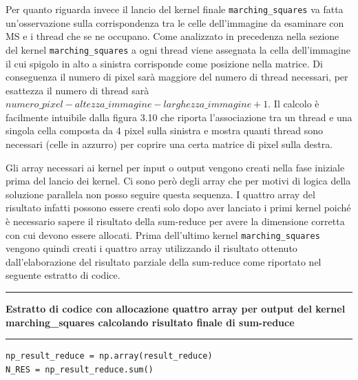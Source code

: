 \documentclass[12pt,a4paper]{report}
\begin{document}
{\newpage
Per quanto riguarda invece il lancio del kernel finale \verb|marching_squares| va fatta un'osservazione sulla corrispondenza tra le celle dell'immagine da esaminare con MS e i thread che se ne occupano. Come analizzato in precedenza nella sezione del kernel \verb|marching_squares| a ogni thread viene assegnata la cella dell'immagine il cui spigolo in alto a sinistra corrisponde come posizione nella matrice. Di conseguenza il numero di pixel sarà maggiore del numero di thread necessari, per esattezza il numero di thread sarà $numero\_pixel - altezza\_immagine - larghezza\_immagine + 1$. Il calcolo è facilmente intuibile dalla figura 3.10 che riporta l'associazione tra un thread e una singola cella composta da 4 pixel sulla sinistra e mostra quanti thread sono necessari (celle in azzurro) per coprire una certa matrice di pixel sulla destra.

\begin{figure}[H]
\centering
\begin{floatrow}[1]
\end{floatrow}
\end{figure} 
\newpage
Gli array necessari ai kernel per input o output vengono creati nella fase iniziale prima del lancio dei kernel. Ci sono però degli array che per motivi di logica della soluzione parallela non posso seguire questa sequenza. I quattro array del risultato infatti possono essere creati solo dopo aver lanciato i primi kernel poiché è necessario sapere il risultato della sum-reduce per avere la dimensione corretta con cui devono essere allocati.
Prima dell'ultimo kernel \verb|marching_squares| vengono quindi creati i quattro array utilizzando il risultato ottenuto dall'elaborazione del risultato parziale della sum-reduce come riportato nel seguente estratto di codice. \\
\noindent\rule[0.5ex]{\linewidth}{2pt}
\small{\textbf{Estratto di codice con allocazione quattro array per output del kernel marching\_squares calcolando risultato finale di sum-reduce}} \\
\noindent\rule[0.5ex]{\linewidth}{1pt}
\begin{lstlisting}
np_result_reduce = np.array(result_reduce) 
N_RES = np_result_reduce.sum() 


\end{lstlisting}}
\end{document}
